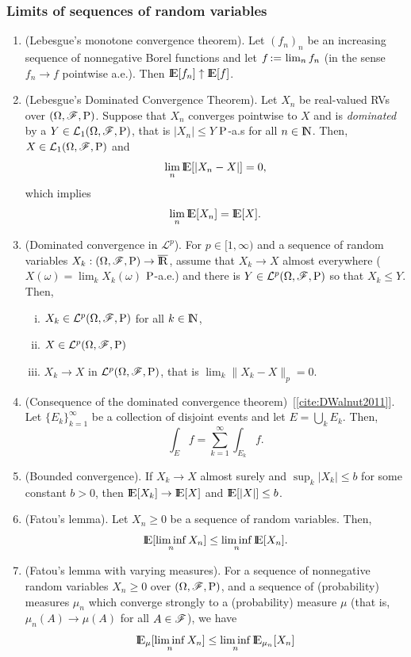 \documentclass[a4paper,10pt]{article}
\begin{document}
\subsubsection{Limits of sequences of random variables}
\begin{enumerate}
 \item (Lebesgue's monotone convergence theorem). Let $(f_n)_n$ be an increasing sequence of 
       nonnegative Borel functions and let $f {}\mathop{\mathrel{:}=}{} \lim_n f_n$ (in the sense $f_n\to f$ pointwise a.e.). 
       Then $\E[f_n] \uparrow \E[f]$.
      
 \item 	(Lebesgue's Dominated Convergence Theorem). Let $X_n$ be real-valued RVs over $(\Omega,\mathscr{F},\mathrm{P})$. 
	Suppose that $X_n$ converges pointwise to $X$ and is \textit{dominated} by a 
	$Y\in\mathcal{L}_1(\Omega,\mathscr{F},\mathrm{P})$, that is $|X_n|\leq Y$ $\mathrm{P}$-a.s for all $n\in\N$. 
	Then, $X\in\mathcal{L}_1(\Omega,\mathscr{F},\mathrm{P})$
	and
	\[
	 \lim_n \E[|X_n-X|] = 0,
	\]
        which implies
        \[
         \lim_n \E[X_n] = \E[X].
        \]

 \item (Dominated convergence in $\mathcal{L}^p$).
       For $p\in[1,\infty)$ and a sequence of random variables $X_k:\ofp\to\barre$,
       assume that $X_k\to X$ almost everywhere ($X(\omega)=\lim_k X_k(\omega)$ $\mathrm{P}$-a.e.)
       and there is $Y\in\mathcal{L}^p(\Omega,\mathscr{F},\mathrm{P})$ so that $X_k\leq Y$. Then, 
       \begin{enumerate}[i.]
        \item $X_k\in\mathcal{L}^p(\Omega,\mathscr{F},\mathrm{P})$ for all $k\in\N$,
        \item $X\in\mathcal{L}^p(\Omega,\mathscr{F},\mathrm{P})$ 
        \item $X_k\to X$ in $\mathcal{L}^p(\Omega,\mathscr{F},\mathrm{P})$, that is $\lim_k \|X_k-X\|_p = 0$.
       \end{enumerate}

 \item (Consequence of the dominated convergence theorem)~[\ref{cite:DWalnut2011}]. 
       Let $\{E_k\}_{k=1}^{\infty}$ be a collection of disjoint events and let $E=\bigcup_{k}E_k$.
       Then,
       \[
        \int_E f = \sum_{k=1}^{\infty} \int_{E_k} f.
       \]

 \item  (Bounded convergence). If $X_k \to X$ almost surely and $\sup_k |X_k| \leq b$
        for some constant $b>0$, then $\E[X_k]\to \E[X]$ and $\E[|X|] \leq b$.
       
 \item 	(Fatou's lemma). Let $X_n\geq 0$ be a sequence of random variables. 
	Then, 
	\[
	\E[\liminf_n X_n] \leq  \liminf_n \E[X_n].
	\]
 \item 	(Fatou's lemma with varying measures). For a sequence of nonnegative random variables $X_n\geq 0$ over $(\Omega,\mathscr{F},\mathrm{P})$,
	and a sequence of (probability) measures $\mu_n$ which converge strongly to a (probability)
	measure $\mu$ (that is, $\mu_n(A)\to\mu(A)$ for all $A\in\mathscr{F}$), we have
	\[
	 \E_\mu[\liminf_n X_n]\leq \liminf_n \E_{\mu_n}[ X_n]
	\]


\end{enumerate}
\end{document}
